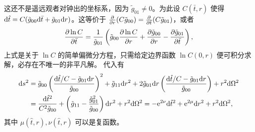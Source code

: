 这还不是遥远观者对钟出的坐标系，因为 $\tilde g_{01}\ne 0$。为此设 $C(\bar t,r)$ 使得 $\dd\hat t=C(\tilde g_{00}\dd\bar t+\tilde g_{01}\dd r)$。这等价于 $\pdv{r}(C\tilde g_{00})=\pdv{\bar t}(C\tilde g_{01})$，或者
\[
    \pdv{\ln C}{\bar t}=\frac{1}{\tilde g_{01}}\left(\tilde g_{00}\pdv{\ln C}{r}+\pdv{\tilde g_{00}}{r}-\pdv{\tilde g_{01}}{\bar t}\right),
\]
上式是关于 $\ln C$ 的简单偏微分方程，只需给定边界函数 $\ln C(0,r)$ 便可积分求解，必存在不唯一的非平凡解。
代入有
\begin{align*}
    \dd s^2&=\tilde g_{00}\left(\frac{\dd\hat t/C-\tilde g_{01}\dd r}{\tilde g_{00}}\right)^2+\tilde g_{11}\dd r^2+2\tilde g_{01}\dd r\left(\frac{\dd\hat t/C-\tilde g_{01}\dd r}{\tilde g_{00}}\right)+r^2\dd\Omega^2\\
    &=\frac{\dd\hat t^2}{C^2\tilde g_{00}}+\left(\tilde g_{11}-\frac{\tilde g_{01}^2}{\tilde g_{00}}\right)\dd r^2+r^2\dd\Omega^2=-\mathrm{e}^{2\nu}\dd\hat t^2+\mathrm{e}^{2\mu}\dd r^2+r^2\dd\Omega^2,
\end{align*}
其中 $\mu(\hat t,r),\nu(\hat t,r)$ 可以是复函数。

